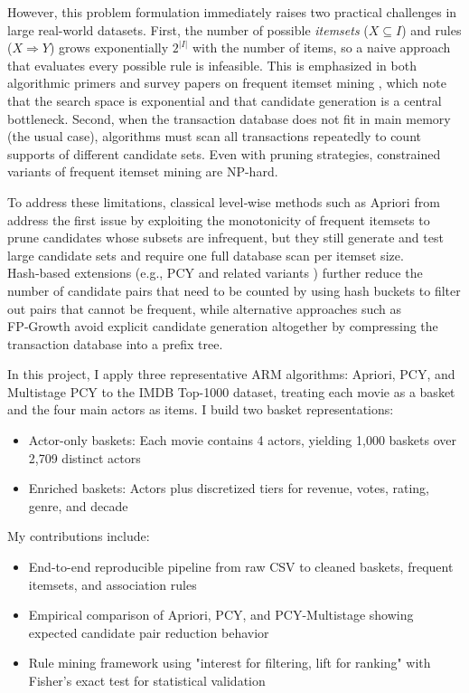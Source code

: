 \documentclass{article}  %
\begin{document}
However, this problem formulation immediately raises two practical challenges in large real-world datasets. First, the number of possible \textit{itemsets} (\(X \subseteq I\)) and rules (\(X \Rightarrow Y\)) grows exponentially \(2^{|I|}\) with the number of items, so a naive approach that evaluates every possible rule is infeasible.  This is emphasized in both algorithmic primers and survey papers on frequent itemset mining  \parencite{haripreethiEnhancementAprioriAlgorithm2025,PrimerFrequentItemset}, which note that the search space is exponential and that candidate generation is a central bottleneck. Second, when the transaction database does not fit in main memory (the usual case), algorithms must scan all transactions repeatedly to count supports of different candidate sets.  Even with pruning strategies, constrained variants of frequent itemset mining are NP-hard. 

To address these limitations, classical level‑wise methods such as Apriori from \cite{agrawalMiningAssociationRules1993} address the first issue by exploiting the monotonicity of frequent itemsets to prune candidates whose subsets are infrequent, but they still generate and test large candidate sets and require one full database scan per itemset size. Hash‑based extensions (e.g., PCY and related variants ) further reduce the number of candidate pairs that need to be counted by using hash buckets to filter out pairs that cannot be frequent, while alternative approaches such as FP‑Growth avoid explicit candidate generation altogether by compressing the transaction database into a prefix tree.
 
In this project, I apply three representative ARM algorithms: Apriori, PCY, and Multistage PCY  to the IMDB Top-1000 dataset, treating each movie as a basket and the four main actors as items. I build two basket representations:
\begin{itemize}
    \item  Actor-only baskets: Each movie contains 4 actors, yielding 1,000 baskets over 2,709 distinct actors
    \item  Enriched baskets: Actors plus discretized tiers for revenue, votes, rating, genre, and decade
\end{itemize}

My contributions include:
\begin{itemize}
    \item End-to-end reproducible pipeline from raw CSV to cleaned baskets, frequent itemsets, and association rules
    \item Empirical comparison of Apriori, PCY, and PCY-Multistage showing expected candidate pair reduction behavior
    \item  Rule mining framework using "interest for filtering, lift for ranking" with Fisher's exact test for statistical validation
\end{itemize}
\end{document}
